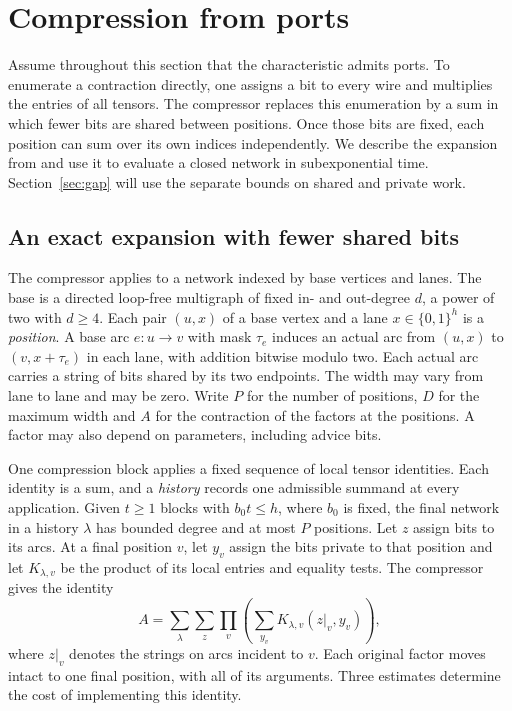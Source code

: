 \section{Compression from ports}\label{sec:compr}

Assume throughout this section that the characteristic admits ports.
To enumerate a contraction directly, one assigns a bit to every wire
and multiplies the entries of all tensors. The compressor replaces
this enumeration by a sum in which fewer bits are shared between
positions. Once those bits are fixed, each position can sum over its
own indices independently. We describe the expansion from
\cite[Theorems~ and~,
Lemma~]{oaG} and use it to evaluate a closed
network in subexponential time. Section~\ref{sec:gap} will use the
separate bounds on shared and private work.

\subsection{An exact expansion with fewer shared bits}
The compressor applies to a network indexed by base vertices and lanes.
The base is a directed loop-free multigraph of fixed in- and out-degree
$d$, a power of two with $d\ge4$. Each pair $(u,x)$ of a base vertex
and a lane $x\in\{0,1\}^h$ is a \emph{position}. A base arc
$e:u\to v$ with mask $\tau_e$ induces an actual arc from $(u,x)$ to
$(v,x+\tau_e)$ in each lane, with addition bitwise modulo two. Each
actual arc carries a string of bits shared by its two endpoints. The
width may vary from lane to lane and may be zero. Write $P$ for the
number of positions, $D$ for the maximum width and $A$ for the
contraction of the factors at the positions. A factor may also
depend on parameters, including advice bits.

One compression block applies a fixed sequence of local tensor
identities. Each identity is a sum, and a \emph{history} records one
admissible summand at every application. Given $t\ge1$ blocks with
$b_0t\le h$, where $b_0$ is fixed, the final network in a history
$\lambda$ has bounded degree and at most $P$ positions. Let $z$ assign
bits to its arcs. At a final position $v$, let $y_v$ assign the bits
private to that position and let $K_{\lambda,v}$ be the product of its
local entries and equality tests. The compressor gives the identity
\[
 A=\sum_{\lambda}\sum_z
          \prod_v\left(\sum_{y_v}
             K_{\lambda,v}(z|_v,y_v)\right),
\]
where $z|_v$ denotes the strings on arcs incident to $v$. Each original
factor moves intact to one final position, with all of its arguments.
Three estimates determine the cost of implementing this identity.

